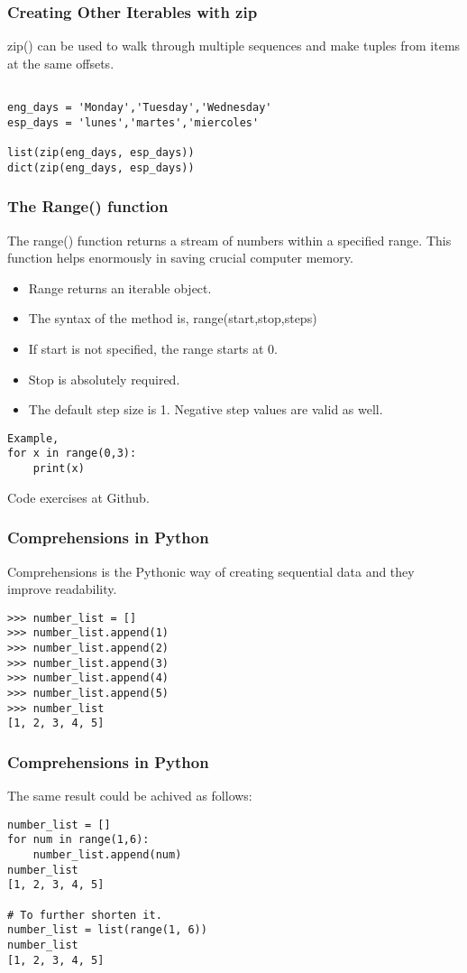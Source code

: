 \documentclass{beamer}
\begin{document}
\begin{frame}[fragile]
\frametitle{Creating Other Iterables with zip}
zip() can be used to walk through multiple sequences and make tuples from items at the same offsets.
\begin{lstlisting}	

eng_days = 'Monday','Tuesday','Wednesday'
esp_days = 'lunes','martes','miercoles'

list(zip(eng_days, esp_days))
dict(zip(eng_days, esp_days))
\end{lstlisting}

\end{frame}

\begin{frame}[fragile]
\frametitle{The Range() function}
The range() function returns a stream of numbers within a specified range. This function helps enormously in saving crucial computer memory.
\begin{itemize}
\item Range returns an iterable object.
\item The syntax of the method is, range(start,stop,steps)
\item If start is not specified, the range starts at 0.
\item Stop is absolutely required.
\item The default step size is 1. Negative step values are valid as well.
\end{itemize}
\begin{lstlisting}
Example,
for x in range(0,3):
	print(x)

\end{lstlisting}
	
Code exercises at Github.
\end{frame}

\begin{frame}[fragile]
\frametitle{Comprehensions in Python}
Comprehensions is the Pythonic way of creating sequential data and they improve readability.
\begin{lstlisting}
>>> number_list = []
>>> number_list.append(1)
>>> number_list.append(2)
>>> number_list.append(3)
>>> number_list.append(4)
>>> number_list.append(5)
>>> number_list
[1, 2, 3, 4, 5]
\end{lstlisting}
\end{frame}

\begin{frame}[fragile]
\frametitle{Comprehensions in Python}
The same result could be achived as follows:
\begin{lstlisting}
number_list = []
for num in range(1,6):
    number_list.append(num)
number_list
[1, 2, 3, 4, 5]

# To further shorten it.
number_list = list(range(1, 6))
number_list
[1, 2, 3, 4, 5]
\end{lstlisting}
\end{frame}
\end{document}
